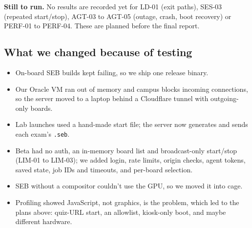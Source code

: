 \documentclass[11pt]{article}
\begin{document}
\textbf{Still to run.} No results are recorded yet for LD-01 (exit paths), SES-03 (repeated start/stop), AGT-03 to AGT-05 (outage, crash, boot recovery) or PERF-01 to PERF-04. These are planned before the final report.

\subsection{What we changed because of testing}
\begin{itemize}
  \item On-board SEB builds kept failing, so we ship one release binary.
  \item Our Oracle VM ran out of memory and campus blocks incoming connections, so the server moved to a laptop behind a Cloudflare tunnel with outgoing-only boards.
  \item Lab launches used a hand-made start file; the server now generates and sends each exam's \texttt{.seb}.
  \item Beta had no auth, an in-memory board list and broadcast-only start/stop (LIM-01 to LIM-03); we added login, rate limits, origin checks, agent tokens, saved state, job IDs and timeouts, and per-board selection.
  \item SEB without a compositor couldn't use the GPU, so we moved it into cage.
  \item Profiling showed JavaScript, not graphics, is the problem, which led to the plans above: quiz-URL start, an allowlist, kiosk-only boot, and maybe different hardware.
\end{itemize}

\end{document}
